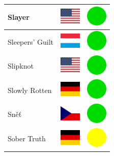 \documentclass[12pt, a4paper, twoside]{report}
\begin{document}
\begin{center}
\begin{longtable}{|p{5cm}|p{2cm}|p{2cm}|}
 Slayer                                                     & \includegraphics[width=1cm]{../img/flags/us} &   \includegraphics[width=1cm]{../likes/y} \\ \hline
 Sleepers' Guilt                                            & \includegraphics[width=1cm]{../img/flags/lu} &   \includegraphics[width=1cm]{../likes/y} \\ \hline
 Slipknot                                                   & \includegraphics[width=1cm]{../img/flags/us} &   \includegraphics[width=1cm]{../likes/y} \\ \hline
 Slowly Rotten                                              & \includegraphics[width=1cm]{../img/flags/de} &   \includegraphics[width=1cm]{../likes/y} \\ \hline
 Sněť                                                       & \includegraphics[width=1cm]{../img/flags/cz} &   \includegraphics[width=1cm]{../likes/y} \\ \hline
 Sober Truth                                                & \includegraphics[width=1cm]{../img/flags/de} &   \includegraphics[width=1cm]{../likes/m} \\ \hline

\end{longtable}
\end{center}
\end{document}
